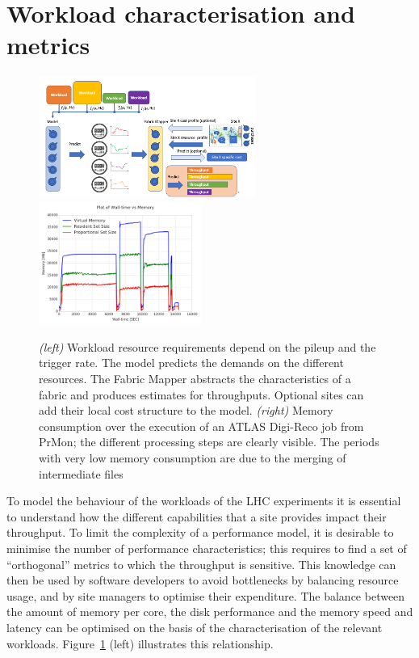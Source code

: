 \section{Workload characterisation and metrics}
\begin{figure}[h]
  \centering
  \includegraphics[height=4cm]{CHEP-Model-2.png}
  \hfill
  \includegraphics[height=4cm]{prmon.png}
  \caption{{\em (left)} Workload resource requirements depend on the
    pileup and the trigger rate. The model predicts the demands on the
    different resources. The Fabric Mapper abstracts the
    characteristics of a fabric and produces estimates for
    throughputs. Optional sites can add their local cost structure to
    the model. {\em (right)} Memory consumption over the execution of
    an ATLAS Digi-Reco job from PrMon; the different processing steps
    are clearly visible. The periods with very low memory consumption
    are due to the merging of intermediate files}
  \label{fig:mapping}
\end{figure}

To model the behaviour of the workloads of the LHC experiments it is
essential to understand how the different capabilities that a site
provides impact their throughput. To limit the complexity of a
performance model, it is desirable to minimise the number of
performance characteristics; this requires to find a set of
``orthogonal'' metrics to which the throughput is sensitive. This
knowledge can then be used by software developers to avoid bottlenecks
by balancing resource usage, and by site managers to optimise their
expenditure. The balance between the amount of memory per core, the
disk performance and the memory speed and latency can be optimised on
the basis of the characterisation of the relevant
workloads. Figure~\ref{fig:mapping} (left) illustrates this relationship.

